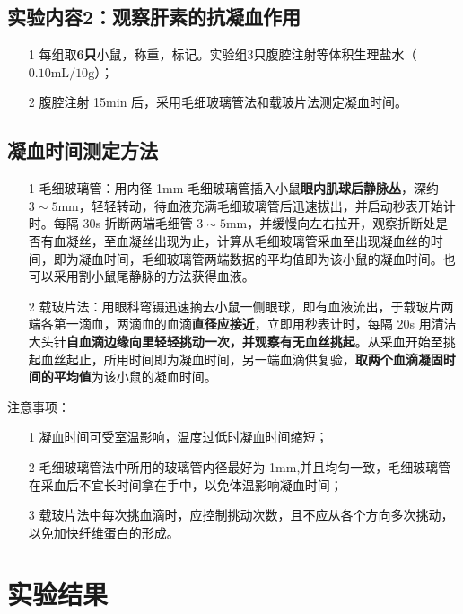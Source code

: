 \documentclass[UTF8]{ctexart}
\begin{document}
\subsection{实验内容2：观察肝素的抗凝血作用}

\begin{itemize}
    \item [1] 每组取\textbf{6只}小鼠，称重，标记。实验组3只腹腔注射等体积生理盐水（$0.10\text{mL}/10\text{g}$）；
    \item [2] 腹腔注射 15min 后，采用毛细玻璃管法和载玻片法测定凝血时间。
\end{itemize}

\subsection{凝血时间测定方法}

\begin{itemize}
    \item [1] 毛细玻璃管：用内径 1mm 毛细玻璃管插入小鼠\textbf{眼内肌球后静脉丛}，深约 $3\sim 5\text{mm}$，轻轻转动，待血液充满毛细玻璃管后迅速拔出，并启动秒表开始计时。每隔 30s 折断两端毛细管 $3\sim 5\text{mm}$，并缓慢向左右拉开，观察折断处是否有血凝丝，至血凝丝出现为止，计算从毛细玻璃管采血至出现凝血丝的时间，即为凝血时间，毛细玻璃管两端数据的平均值即为该小鼠的凝血时间。也可以采用割小鼠尾静脉的方法获得血液。
    \item [2] 载玻片法：用眼科弯镊迅速摘去小鼠一侧眼球，即有血液流出，于载玻片两端各第一滴血，两滴血的血滴\textbf{直径应接近}，立即用秒表计时，每隔 20s 用清洁大头针\textbf{自血滴边缘向里轻轻挑动一次，并观察有无血丝挑起}。从采血开始至挑起血丝起止，所用时间即为凝血时间，另一端血滴供复验，\textbf{取两个血滴凝固时间的平均值}为该小鼠的凝血时间。
\end{itemize}

注意事项：

\begin{itemize}
    \item [1] 凝血时间可受室温影响，温度过低时凝血时间缩短；
    \item [2] 毛细玻璃管法中所用的玻璃管内径最好为 1mm,并且均匀一致，毛细玻璃管在采血后不宜长时间拿在手中，以免体温影响凝血时间；
    \item [3] 载玻片法中每次挑血滴时，应控制挑动次数，且不应从各个方向多次挑动，以免加快纤维蛋白的形成。
\end{itemize}

\section{实验结果}
\end{document}
